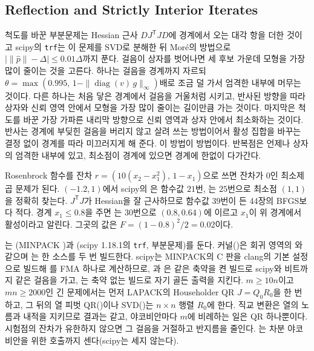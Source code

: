 \subsection{Reflection and Strictly Interior Iterates}

척도를 바꾼 부분문제는 Hessian 근사 $D J^{\mathsf T}JD$에 경계에서 오는 대각 항을 더한 것이고 scipy의 \texttt{trf}는 이 문제를 SVD로 분해한 뒤 Moré의 방법으로 $\bigl|\|\hat p\|-\Delta\bigr|\le0.01\Delta$까지 푼다. 걸음이 상자를 벗어나면 세 후보 가운데 모형을 가장 많이 줄이는 것을 고른다. 하나는 걸음을 경계까지 자르되 $\theta=\max(0.995,\,1-\|\operatorname{diag}(v)\,g\|_\infty)$배로 조금 덜 가서 엄격한 내부에 머무는 것이다. 다른 하나는 처음 닿은 경계에서 걸음을 거울처럼 시키고, 반사된 방향을 따라 상자와 신뢰 영역 안에서 모형을 가장 많이 줄이는 길이만큼 가는 것이다. 마지막은 척도를 바꾼 가장 가파른 내리막 방향으로 신뢰 영역과 상자 안에서 최소화하는 것이다. 반사는 경계에 부딪힌 걸음을 버리지 않고 살려 쓰는 방법이어서 활성 집합을 바꾸는 결정 없이 경계를 따라 미끄러지게 해 준다. 이 방법이  방법이다\cite{branch1999}. 반복점은 언제나 상자의 엄격한 내부에 있고, 최소점이 경계에 있으면 경계에 한없이 다가간다.

Rosenbrock 함수를 잔차 $r=(10(x_2-x_1^2),\,1-x_1)$으로 쓰면 잔차가 $0$인 최소제곱 문제가 된다. $(-1.2,1)$에서 scipy의 은 함수값 $21$번, 는 $25$번으로 최소점 $(1,1)$을 정확히 찾는다. $J^{\mathsf T}J$가 Hessian을 잘 근사하므로 함수값 $39$번이 든 44장의 BFGS보다 적다. 경계 $x_1\le0.8$을 주면 는 $30$번으로 $(0.8,0.64)$에 이르고 $x_1$이 위 경계에서 활성이라고 알린다. 그곳의 값은 $F=(1-0.8)^2/2=0.02$이다.

\begin{instardust}
는 (MINPACK )과 (scipy 1.18.1의 \texttt{trf},  부분문제)를 둔다. 커널()은 회귀 영역의 와 같으며 는 한 소스를 두 번 빌드한다. scipy는 MINPACK의 C 판을 clang의 기본 설정으로 빌드해 를 FMA 하나로 계산하므로, 과 은 같은 축약을 켠 빌드로 scipy와 비트까지 같은 걸음을 가고, 는 축약 없는 빌드로 자기 골든 출력을 지킨다. $m\ge10n$이고 $mn\ge2000$인 긴 문제에서는 먼저 LAPACK의 Householder QR $J=Q_0R_0$을 한 번 하고, 그 뒤의 열 피벗 QR()이나 SVD()는 $n\times n$ 행렬 $R_0$에 한다. 직교 변환은 열의 노름과 내적을 지키므로 결과는 같고, 야코비안마다 $m$에 비례하는 일은 QR 하나뿐이다. 시험점의 잔차가 유한하지 않으면 그 걸음을 거절하고 반지름을 줄인다. 는 차분 야코비안을 위한 호출까지 센다(scipy는 세지 않는다).
\end{instardust}

